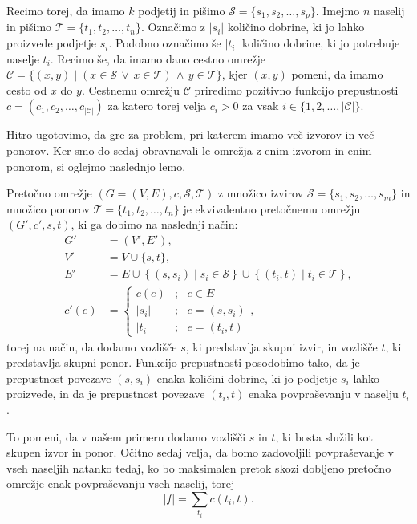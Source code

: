 \documentclass[mat1]{fmfdelo}
\begin{document}
Recimo torej, da imamo $k$ podjetij in pišimo $\mathcal{S} = \{s_1, s_2, \dotsc, s_p\}$. Imejmo $n$ naselij in pišimo $\mathcal{T} = \{t_1, t_2, \dotsc, t_n\}$.
Označimo z $|s_i|$ količino dobrine, ki jo lahko proizvede podjetje $s_i$. Podobno označimo še $|t_i|$ količino dobrine, ki jo potrebuje naselje $t_i$.
Recimo še, da imamo dano cestno omrežje $\mathcal{C} = \{(x,y) \mid (x \in \mathcal{S} \,\vee\, x \in \mathcal{T}) \,\wedge\, y \in \mathcal{T}\}$, kjer $(x,y)$ pomeni,
da imamo cesto od $x$ do $y$. Cestnemu omrežju $\mathcal{C}$ priredimo pozitivno funkcijo prepustnosti
$c = (c_1, c_2, \dotsc, c_{|\mathcal{C}|})$ za katero torej velja $c_i > 0$ za vsak $i \in \{1, 2, \dotsc, |\mathcal{C}|\}$.

Hitro ugotovimo, da gre za problem, pri katerem imamo več izvorov in več ponorov. Ker smo do sedaj obravnavali le omrežja z enim izvorom in enim
ponorom, si oglejmo naslednjo lemo.

\begin{lema}
  Pretočno omrežje $(G = (V,E), c, \mathcal{S}, \mathcal{T})$ z množico izvirov $\mathcal{S} = \{s_1, s_2, \dotsc, s_m\}$ in množico ponorov $\mathcal{T} = \{t_1, t_2, \dotsc, t_n\}$
  je ekvivalentno pretočnemu omrežju $(G', c', s, t)$, ki ga dobimo na naslednji način:
  \begin{align*}
    G' &= (V', E'),\\
    V' &= V \cup \{s, t\},\\
    E' &= E \cup \left\{(s, s_i) \mid s_i \in \mathcal{S}\right\} \cup \left\{(t_i, t) \mid t_i \in \mathcal{T}\right\},\\
    c'(e) &= \begin{cases} c(e) &;~~~ e \in E\\ |s_i| &;~~~ e = (s, s_i)\\ |t_i| &;~~~ e = (t_i, t) \end{cases},
  \end{align*}
  torej na način, da dodamo vozlišče $s$, ki predstavlja skupni izvir, in vozlišče $t$, ki predstavlja skupni ponor. Funkcijo prepustnosti posodobimo tako,
  da je prepustnost povezave $(s, s_i)$ enaka količini dobrine, ki jo podjetje $s_i$ lahko proizvede, in da je prepustnost povezave $(t_i, t)$ enaka povpraševanju v
  naselju $t_i$.
\end{lema}

To pomeni, da v našem primeru dodamo vozlišči $s$ in $t$, ki bosta služili kot skupen izvor in ponor. Očitno sedaj velja, da bomo zadovoljili povpraševanje v vseh naseljih natanko tedaj, ko bo
maksimalen pretok skozi dobljeno pretočno omrežje enak povpraševanju vseh naselij, torej \[ |f| = \sum_{t_i} c(t_i, t). \]
\end{document}
